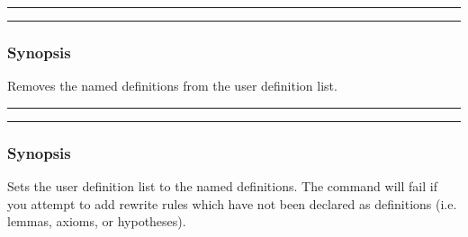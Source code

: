 \vspace{2mm}
\hrule
\vspace{2mm}
\begin{Large}
\end{Large}
\vspace{2mm}
\hrule
\vspace{2mm}


\subsubsection*{Synopsis}
Removes the named definitions from the user definition list.

\vspace{2mm}
\hrule
\vspace{2mm}
\begin{Large}
\end{Large}
\vspace{2mm}
\hrule
\vspace{2mm}


\subsubsection*{Synopsis}
Sets the user definition list to the named definitions. The command will fail
if you attempt to add rewrite rules which have not been declared as
definitions (i.e. lemmas, axioms, or hypotheses).